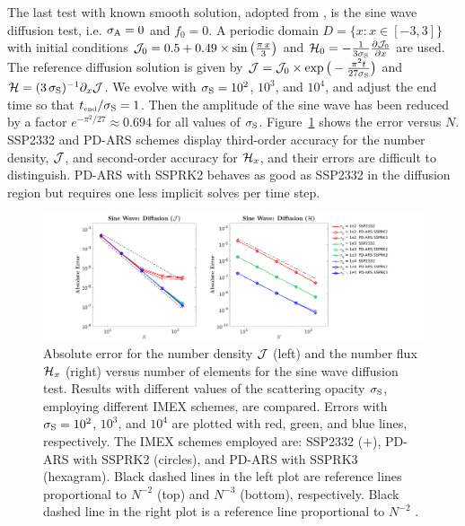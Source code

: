 The last test with known smooth solution, adopted from \cite{radice_etal_2013}, is the sine wave diffusion test, i.e. $\sigma_{{\rm A}} = 0$ and $f_0 = 0$.
A periodic domain $D=\{x:x\in[-3,3]\}$ with initial conditions $\mathcal{J}_{0} = 0.5+0.49\times\sin\big(\frac{\pi\,x}{3}\big)$ and $\mathcal{H}_{0} =-\frac{1}{3\sigma_{{\rm S}}}\frac{\partial \mathcal{J}_{0}}{\partial x}$ are used.  
The reference diffusion solution is given by $\mathcal{J} = \mathcal{J}_{0} \times \exp\big(-\frac{\pi^2 t}{27\sigma_{{\rm S}}}\big)$ and $\mathcal{H} = (3\,\sigma_{{\rm S}})^{-1}\partial_{x}{\mathcal{J}}$.  
We evolve with $\sigma_{{\rm S}}=10^{2}$, $10^{3}$, and $10^{4}$, and adjust the end time so that $t_{\mbox{\tiny end}}/\sigma_{{\rm S}}=1$. 
Then the amplitude of the sine wave has been reduced by a factor $e^{-\pi^{2}/27}\approx0.694$ for all values of $\sigma_{{\rm S}}$. 
Figure~\ref{fig:SineWaveDiffusionJ} shows the error versus $N$.  
SSP2332 and PD-ARS schemes display third-order accuracy for the number density, $\mathcal{J}$, and second-order accuracy for $\mathcal{H}_{x}$, and their errors are difficult to distinguish.
PD-ARS with SSPRK2 behaves as good as SSP2332 in the diffusion region but requires one less implicit solves per time step.  

\begin{figure}[h]
  \centering
  \centerline{\includegraphics[width=1.2\textwidth]{figures/SineWaveDiffusion}}
   \caption{Absolute error for the number density $\mathcal{J}$ (left) and the number flux $\mathcal{H}_{x}$ (right) versus number of elements for the sine wave diffusion test.  Results with different values of the scattering opacity $\sigma_{{\rm S}}$, employing different IMEX schemes, are compared.  Errors with $\sigma_{{\rm S}}=10^{2}$, $10^{3}$, and $10^{4}$ are plotted with red, green, and blue lines, respectively.  The IMEX schemes employed are:  SSP2332 ($+$), PD-ARS with SSPRK2 (circles), and PD-ARS with SSPRK3 (hexagram). Black dashed lines in the left plot are reference lines proportional to $N^{-2}$ (top) and $N^{-3}$ (bottom), respectively. Black dashed line in the right plot is a reference line proportional to $N^{-2}$ .}
   \label{fig:SineWaveDiffusionJ}
\end{figure}

